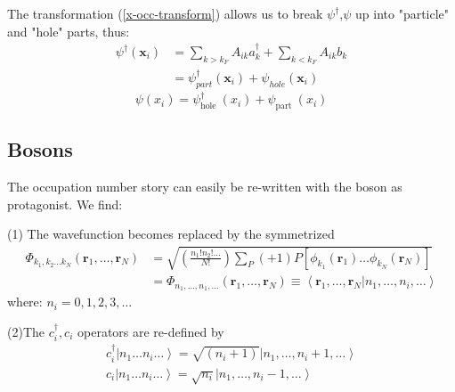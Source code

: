The transformation (\ref{x-occ-transform}) allows us to break $\psi^{\dagger}$,$\psi$ up into "particle" and "hole" parts, thus:
\begin{equation}\begin{aligned}
\psi^{\dagger}\left(\mathbf{x}_{i}\right) &=\sum_{k>k_{F}} A_{i k} a_{k}^{\dagger}+\sum_{k<k_{F}} A_{i k} b_{k} \\
&=\psi_{p a r t}^{\dagger}\left(\mathbf{x}_{i}\right)+\psi_{h o l e}\left(\mathbf{x}_{i}\right)
\end{aligned}\end{equation}
\begin{equation}\psi\left(x_{i}\right)=\psi_{\text {hole }}^{\dagger}\left(x_{i}\right)+\psi_{\text {part }}\left(x_{i}\right)\end{equation}

\subsection{Bosons}
The occupation number story can easily be re-written with the boson as protagonist. We find:

(1) The wavefunction becomes replaced by the symmetrized
\begin{equation}\begin{aligned}
\Phi_{k_{1}, k_{2} \ldots k_{N}}\left(\mathbf{r}_{1}, \ldots, \mathbf{r}_{N}\right) &=\sqrt{\left(\frac{n_{1} ! n_{2} ! \ldots}{N !}\right) \sum_{P}(+1) P\left[\phi_{k_{1}}\left(\mathbf{r}_{1}\right) \ldots \phi_{k_{N}}\left(\mathbf{r}_{N}\right)\right]} \\
&=\Phi_{n_{1}, \ldots, n_{1}, \ldots}\left(\mathbf{r}_{1}, \ldots, \mathbf{r}_{N}\right) \equiv\left\langle\mathbf{r}_{1}, \ldots, \mathbf{r}_{N} | n_{1}, \ldots, n_{i}, \ldots\right\rangle
\end{aligned}\end{equation}
where: $n_i=0,1,2,3,\ldots$

(2)The $c_{i}^{\dagger}, c_{i}$ operators are re-defined by
\begin{equation}\begin{array}{l}
c_{i}^{\dagger}\left|n_{1} \ldots n_{i} \ldots\right\rangle=\sqrt{( n_{i}+1)}\left|n_{1}, \ldots, n_{i}+1, \ldots\right\rangle \\
c_{i}\left|n_{1} \ldots n_{i} \ldots\right\rangle=\sqrt{n_{i}}\left|n_{1}, \ldots, n_{i}-1, \ldots\right\rangle
\end{array}\end{equation}

